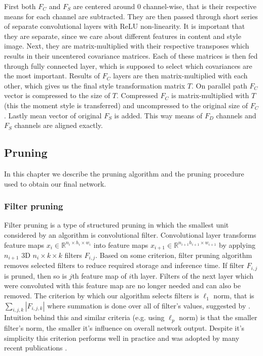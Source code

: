 \documentclass[../Main.tex]{subfiles}
\begin{document}
    First both $F_C$ and $F_S$ are centered around 0 channel-wise, that is their respective 
    means for each channel are subtracted. They are then passed through short series of separate 
    convolutional layers with ReLU non-linearity. It is important that they are separate,
    since we care about different features in content and style image. Next, they 
    are matrix-multiplied with their respective transposes which results in
    their uncentered covariance matrices. Each of these matrices is then fed 
    through fully connected layer, which is supposed to select which covariances
    are the most important. Results of $F_C$ layers are then matrix-multiplied
    with each other, which gives us the final style transformation matrix $T$.
    On parallel path $F_C$ vector is compressed to the size of $T$. Compressed 
    $F_C$ is matrix-multiplied with $T$ (this the moment style is transferred)
    and uncompressed to the original size of $F_C$. Lastly mean vector of original $F_S$
    is added. This way means of $F_D$ channels and $F_S$ channels are aligned
    exactly.
    
    
    
\newpage    

\subsection{Pruning}
    In this chapter we describe the pruning algorithm and the pruning procedure 
    used to obtain our final network.
    \subsubsection{Filter pruning} 
    Filter pruning is a type of structured pruning in which the smallest unit considered by an
    algorithm is convolutional filter. Convolutional layer transforms feature maps
    $x_i \in \mathbb{R}^{n_i \times h_i\times w_i}$ into
    feature maps  $x_{i+1} \in \mathbb{R}^{n_{i+1}h_{i+1} \times w_{i+1}}$ by applying
    $n_{i+1}$ 3D $n_i \times k \times k$ filters $F_{i,j}$. Based on some criterion, filter pruning 
    algorithm removes selected filters to reduce required storage and inference time.
    If filter $F_{i,j}$ is pruned, then so is $j$th feature map of $i$th layer. 
    Filters of the next layer which were convoluted with this feature map are no longer needed 
    and can also be removed. 
    The criterion by which our algorithm selects filters is  
    $\ell_1$ norm, that is $\sum_{i,j,k}|F_{i,j,k}|$ where summation is done
    over all of filter's values, suggested by \cite{li2016pruning}.
    Intuition behind this and similar criteria (e.g. using 
    $\ell_p$ norm) is that the smaller filter's norm, the smaller it's influence 
    on overall network output. Despite it's simplicity this criterion performs well in practice
    and was adopted by many recent publications \cite{lottery1, lottery2}.
    
\end{document}
